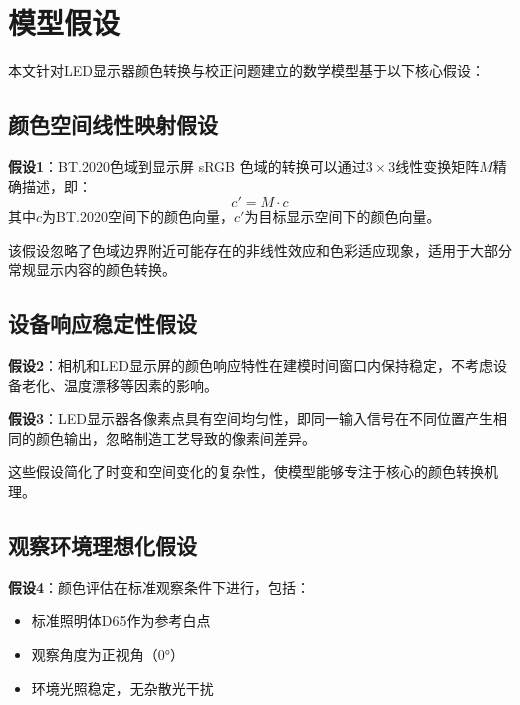 \chapter[\hspace{0pt}模型假设]{{\heiti{}\hspace{0pt}模型假设}}\label{chapter2:模型假设}

\removelofgap
\removelotgap

本文针对LED显示器颜色转换与校正问题建立的数学模型基于以下核心假设：

\section[\hspace{-2pt}颜色空间线性映射假设]{{\heiti{} \hspace{-8pt}颜色空间线性映射假设}}\label{section2: 颜色空间线性映射假设}

\textbf{假设1}：BT.2020色域到显示屏 sRGB 色域的转换可以通过$3\times 3$线性变换矩阵$M$精确描述，即：
$$c' = M \cdot c$$
其中$c$为BT.2020空间下的颜色向量，$c'$为目标显示空间下的颜色向量。

该假设忽略了色域边界附近可能存在的非线性效应和色彩适应现象，适用于大部分常规显示内容的颜色转换。

\section[\hspace{-2pt}设备响应稳定性假设]{{\heiti{} \hspace{-8pt}设备响应稳定性假设}}\label{section2: 设备响应稳定性假设}

\textbf{假设2}：相机和LED显示屏的颜色响应特性在建模时间窗口内保持稳定，不考虑设备老化、温度漂移等因素的影响。

\textbf{假设3}：LED显示器各像素点具有空间均匀性，即同一输入信号在不同位置产生相同的颜色输出，忽略制造工艺导致的像素间差异。

这些假设简化了时变和空间变化的复杂性，使模型能够专注于核心的颜色转换机理。

\section[\hspace{-2pt}观察环境理想化假设]{{\heiti{} \hspace{-8pt}观察环境理想化假设}}\label{section2: 观察环境理想化假设}

\textbf{假设4}：颜色评估在标准观察条件下进行，包括：
\begin{itemize}
    \item 标准照明体D65作为参考白点
    \item 观察角度为正视角（0°）
    \item 环境光照稳定，无杂散光干扰
\end{itemize}

